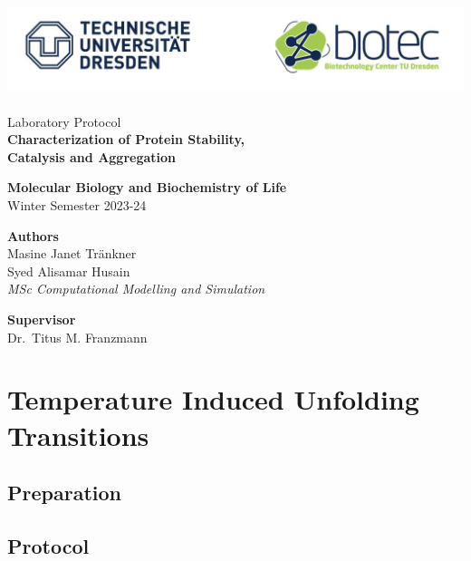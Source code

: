 \documentclass[a4paper,11pt]{article}
\begin{document}
    \begin{titlepage}
        \begin{center}
            \includegraphics[height=7.5em]{../resources/unilogo.png}
            \vspace{5em}

            {\Large Laboratory Protocol} \\ 
            {\LARGE\bfseries Characterization of Protein Stability,\\ Catalysis and Aggregation}
            \vspace{3em}
            
            {\bfseries Molecular Biology and Biochemistry of Life}\\
            Winter Semester 2023-24
            \vspace{15em}

            {\bfseries Authors} \\ 
            Masine Janet Tränkner\\
            Syed Alisamar Husain\\
            {\it MSc Computational Modelling and Simulation}
            \vspace{5em}

            {\bfseries Supervisor} \\ Dr.\ Titus M. Franzmann
        \end{center}
        
    \end{titlepage}
    \pagebreak

    \tableofcontents
    \listoffigures
    \pagebreak

    \section{Temperature Induced Unfolding Transitions}
        \subsection{Preparation}
            \lipsum[1]

        \subsection{Protocol}
            \begin{figure}
            \end{figure}
\end{document}
